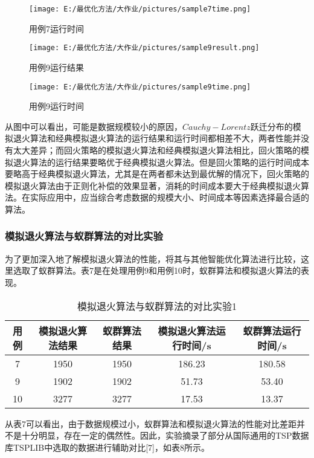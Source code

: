 \documentclass[UTF8]{ctexart}
\begin{document}
\begin{figure}
	\centering
	\texttt{[image: E:/最优化方法/大作业/pictures/sample7time.png]}
	\caption{用例7运行时间}
\end{figure}

\begin{figure}
	\centering
	\texttt{[image: E:/最优化方法/大作业/pictures/sample9result.png]}
	\caption{用例9运行结果}
\end{figure}

\begin{figure}
	\centering
	\texttt{[image: E:/最优化方法/大作业/pictures/sample9time.png]}
	\caption{用例9运行时间}
\end{figure}

从图中可以看出，可能是数据规模较小的原因，$Cauchy-Lorentz$跃迁分布的模拟退火算法和经典模拟退火算法的运行结果和运行时间都相差不大，两者性能并没有太大差异；而回火策略的模拟退火算法和经典模拟退火算法相比，回火策略的模拟退火算法的运行结果要略优于经典模拟退火算法。但是回火策略的运行时间成本要略高于经典模拟退火算法，尤其是在两者都未达到最优解的情况下，回火策略的模拟退火算法由于正则化补偿的效果显著，消耗的时间成本要大于经典模拟退火算法。在实际应用中，应当综合考虑数据的规模大小、时间成本等因素选择最合适的算法。

\subsubsection{模拟退火算法与蚁群算法的对比实验}

为了更加深入地了解模拟退火算法的性能，将其与其他智能优化算法进行比较，这里选取了蚁群算法。表7是在处理用例9和用例10时，蚁群算法和模拟退火算法的表现。

\begin{table} 
	\centering
	\caption{模拟退火算法与蚁群算法的对比实验1}
	\begin{tabular}{ccccc} %
		\toprule %
		用例 & 模拟退火算法结果 & 蚁群算法结果 & 模拟退火算法运行时间/s & 蚁群算法运行时间/s\\
		\hline %
		7 & 1950 & 1950&186.23&180.58 \\
		9 & 1902 & 1902&51.73 &53.40\\
		10 & 3277 & 3277&17.53 &13.37\\
		\bottomrule %
	\end{tabular}
\end{table}

从表7可以看出，由于数据规模过小，蚁群算法和模拟退火算法的性能对比差距并不是十分明显，存在一定的偶然性。因此，实验摘录了部分从国际通用的TSP数据库TSPLIB中选取的数据进行辅助对比[7]，如表8所示。
\end{document}
